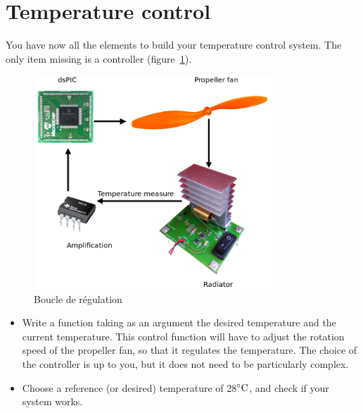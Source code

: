 \documentclass[11pt,a4paper]{article}
\theoremstyle{definition}%
\begin{document}
\section{Temperature control}
You have now all the elements to build your temperature control system.
The only item missing is a controller (figure~\ref{fig:regulation}).

\begin{figure}[h]
\center
\includegraphics[width=0.8\textwidth]{regulation}
\caption{Boucle de régulation}
\label{fig:regulation}
\end{figure}

\begin{itemize}
	\item Write a function taking as an argument the desired temperature and the current temperature.
	This control function will have to adjust the rotation speed of the propeller fan, so that it regulates the temperature.
	The choice of the controller is up to you, but it does not need to be particularly complex.
	\item Choose a reference (or desired) temperature of 28$\celsius$, and check if your system works.
\end{itemize}
\end{document}
